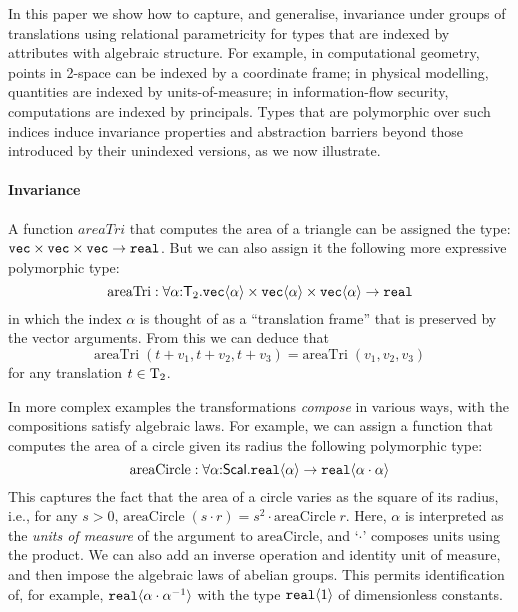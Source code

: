 In this paper we show how to capture, and generalise, invariance under
groups of translations using
relational parametricity for types that are indexed by attributes with
algebraic structure. For example, in computational geometry, points in
2-space can be indexed by a coordinate frame; in physical modelling,
quantities are indexed by units-of-measure; in information-flow
security, computations are indexed by principals.  Types that are
polymorphic over such indices induce invariance properties and
abstraction barriers beyond those introduced by their unindexed
versions, as we now illustrate.

\paragraph{Invariance}
A function $\mathit{areaTri}$ that computes the area of a triangle
can be assigned the type:
$\textup{\texttt{vec}}\times\textup{\texttt{vec}}\times\textup{\texttt{vec}}\to\texttt{real}$.
But we can also assign it the following more expressive polymorphic
type:
\[
\mathrm{areaTri} : \forall\alpha\mathord:\mathsf{T}_2.
  \textup{\texttt{vec}}\langle \alpha \rangle \times \textup{\texttt{vec}}\langle \alpha \rangle \times \textup{\texttt{vec}}\langle \alpha \rangle \to \texttt{real} \\
\]
in which the index $\alpha$ is thought of as a ``translation frame''
that is preserved by the vector arguments. From this we can deduce
that
\[
\mathrm{areaTri}\;(t + v_1, t + v_2, t + v_3) = 
\mathrm{areaTri}\;(v_1, v_2, v_3)
\]
for any translation $t\in\mathrm{T}_2$.

In more complex examples the transformations \emph{compose} in various
ways, with the compositions satisfy algebraic laws. For example, 
we can assign a function that computes the area of a circle given its
radius the following polymorphic type:
\[
\mathrm{areaCircle} : \forall\alpha\mathord:\mathsf{Scal}.\textup{\texttt{real}}\langle \alpha \rangle\to
\textup{\texttt{real}}\langle \alpha\cdot\alpha \rangle
\]
This captures the fact that the area of a circle varies as the square
of its radius, i.e., for any $s>0$, $\mathrm{areaCircle}\;(s\cdot r) =
s^2\cdot \mathrm{areaCircle}\;r$.  Here, $\alpha$ is interpreted as
the \emph{units of measure} of the argument to $\mathrm{areaCircle}$,
and `$\cdot$' composes units using the product. We can also add an
inverse operation and identity unit of measure, and then impose the
algebraic laws of abelian groups. This permits identification of, for
example, $\textup{\texttt{real}}\langle \alpha\cdot\alpha^{-1} \rangle$ with the type
$\textup{\texttt{real}}\langle 1 \rangle$ of dimensionless constants.

